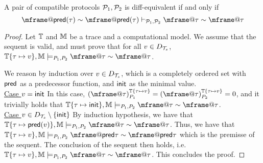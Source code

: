 \begin{lemma}
  A pair of compatible protocols $\mathcal{P}_1,\mathcal{P}_2$ is diff-equivalent if and only if
  \[
    \mframe@\pre(\tau) \sim \mframe@\pre(\tau)
    \vdash_{\calp_1,\calp_2}
    \mframe@\tau \sim \mframe@\tau
  \]
\end{lemma}
\begin{proof}
  Let $\mathbb{T}$ and $\mathbb{M}$ be a trace and a computational model. We assume that the sequent is valid, and must prove that for all $v \in D_{\mathcal{T}_s}$, $\TM\{ \tau \mapsto v\} ,\Mo \models_{P_1,P_2}     \mframe@\tau \sim \mframe@\tau$.

  We reason by induction over $v \in D_{\mathcal{T}_s}$, which is a completely ordered set with $\textsf{pred}$ as a predecessor function, and $\mathsf{init}$ as the minimal value.\\

  \underline{Case $v = \mathsf{init}$} In this case, $\interp{\mframe@\tau}{\TM\{ \tau \mapsto v\} }{P_1} = \interp{\mframe@\tau}{\TM\{ \tau \mapsto v\} }{P_2} = 0$, and it trivially holds that $\TM\{ \tau \mapsto \tinit\} ,\Mo \models_{P_1,P_2}     \mframe@\tau \sim \mframe@\tau$.\\

  \underline{Case $v \in D_{\mathcal{T}_s} \setminus \{\mathsf{init}\}$} By induction hypothesis, we have that $\TM\{ \tau \mapsto \pre(v)\} ,\Mo \models_{P_1,P_2}  \mframe@\tau \sim \mframe@\tau$. Thus, we have that  $\TM\{ \tau \mapsto v\} ,\Mo \models_{P_1,P_2}   \mframe@\pre{\tau} \sim \mframe@\pre{\tau}$ which is the premisse of the sequent. The conclusion of the sequent then holds, i.e.~ $\TM\{ \tau \mapsto v\} ,\Mo \models_{P_1,P_2}   \mframe@\tau \sim \mframe@\tau$. This concludes the proof.
\end{proof}


